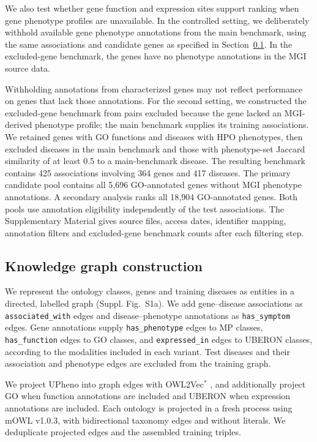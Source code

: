 \documentclass[webpdf,contemporary,large]{oup-authoring-template}%
\theoremstyle{thmstyleone}%
\theoremstyle{thmstyletwo}%
\theoremstyle{thmstylethree}%
\newcommand{\projection}{OWL2Vec$^*$}
\renewcommand{\cite}{\citep}
\begin{document}
We also test whether gene function and expression sites support ranking when
gene phenotype profiles are unavailable. In the controlled setting, we
deliberately withhold available gene phenotype annotations from the main
benchmark, using the same associations and candidate genes as specified in
Section~\ref{sec:graph}. In the excluded-gene benchmark, the genes have no
phenotype annotations in the MGI source data.

Withholding annotations from characterized genes may not reflect performance
on genes that lack those annotations. For the second setting, we
constructed the excluded-gene benchmark from pairs excluded
because the gene lacked an MGI-derived phenotype profile; the main benchmark
supplies its training associations. We retained genes
with GO functions and diseases with HPO phenotypes, then excluded diseases in
the main benchmark and those with phenotype-set Jaccard similarity of at least
0.5 to a main-benchmark disease. The resulting benchmark contains 425
associations involving 364 genes and 417 diseases. The primary candidate pool
contains all 5{,}696 GO-annotated genes without MGI phenotype annotations.
A secondary analysis ranks all 18{,}904 GO-annotated genes. Both pools use
annotation eligibility independently of the test associations.
The Supplementary Material gives source files, access dates,
identifier mapping, annotation filters and excluded-gene benchmark counts
after each filtering step.




\subsection{Knowledge graph construction}
\label{sec:graph}

We represent the ontology classes, genes and
training diseases as entities in a directed, labelled graph
(Suppl. Fig.~S1a). We add gene--disease associations as
\texttt{associated\_with} edges and disease--phenotype annotations as
\texttt{has\_symptom} edges. Gene annotations supply
\texttt{has\_phenotype} edges to MP classes, \texttt{has\_function}
edges to GO classes, and \texttt{expressed\_in} edges to UBERON
classes, according to the modalities included in each variant.
Test diseases and their association and phenotype edges are excluded
from the training graph.



We project UPheno into graph edges with
\projection{} \cite{owl2vecstar}, and additionally project GO when
function annotations are included and UBERON when expression
annotations are included. Each ontology is projected in a fresh process using
mOWL v1.0.3, with bidirectional taxonomy edges and without literals. We
deduplicate projected edges and the assembled training triples.
\end{document}
